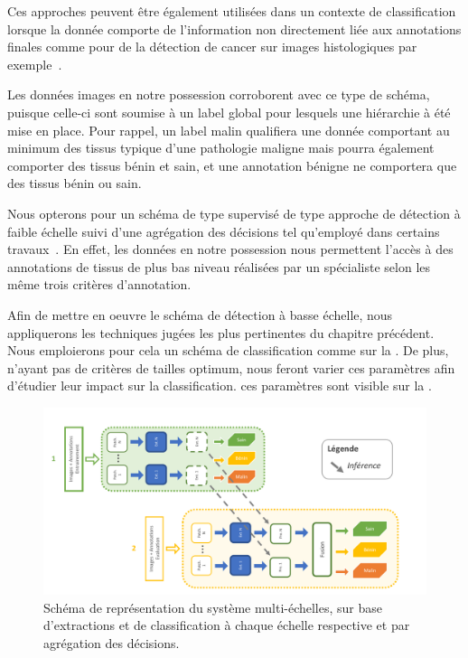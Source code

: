 Ces approches peuvent être également utilisées dans un contexte de classification lorsque la donnée comporte de l'information non directement liée aux annotations finales comme pour de la détection de cancer sur images histologiques par exemple~\cite{Hou2016,Alqudah2019}.\par

Les données images en notre possession corroborent avec ce type de schéma, puisque celle-ci sont soumise à un label global pour lesquels une hiérarchie à été mise en place. Pour rappel, un label malin qualifiera une donnée comportant au minimum des tissus typique d'une pathologie maligne mais pourra également comporter des tissus bénin et sain, et une annotation bénigne ne comportera que des tissus bénin ou sain.\par

Nous opterons pour un schéma de type supervisé de type approche de détection à faible échelle suivi d'une agrégation des décisions tel qu'employé dans certains travaux~\cite{Alqudah2019}. En effet, les données en notre possession nous permettent l'accès à des annotations de tissus de plus bas niveau réalisées par un spécialiste selon les même trois critères d'annotation.\par

Afin de mettre en oeuvre le schéma de détection à basse échelle, nous appliquerons les techniques jugées les plus pertinentes du chapitre précédent. Nous emploierons pour cela un schéma de classification comme sur la . De plus, n'ayant pas de critères de tailles optimum, nous feront varier ces paramètres afin d'étudier leur impact sur la classification. ces paramètres sont visible sur la .\par

\begin{figure}[H]
    \centering
    \includegraphics[width=\linewidth]{contents/chapter_5/resources/scheme_sliding_features.pdf}
    \caption{Schéma de représentation du système multi-échelles, sur base d'extractions et de classification à chaque échelle respective et par agrégation des décisions.}
    \label{fig:scheme_sliding_features}
\end{figure}\par

